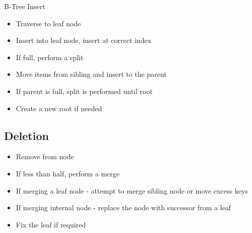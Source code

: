 \begin{algorithm}
  \caption{B-Tree Insert}\label{alg:b-tree-insert}

  

\end{algorithm}

\begin{itemize}
  \item Traverse to leaf node
  \item Insert into leaf node, insert at correct index
  \item If full, perform a split
  \item Move items from sibling and insert to the parent
  \item If parent is full, split is performed until root
  \item Create a new root if needed
\end{itemize}


\subsection{Deletion}

\begin{itemize}
  \item Remove from node
  \item If less than half, perform a merge
  \item If merging a leaf node - attempt to merge sibling node or move excess keys
  \item If merging internal node - replace the node with successor from a leaf
  \item Fix the leaf if required
\end{itemize}



